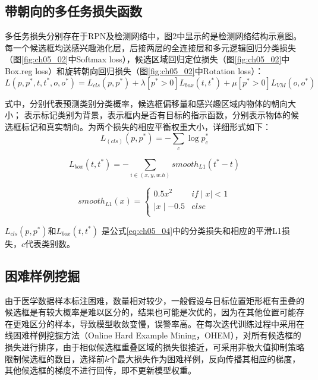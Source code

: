 \subsection{带朝向的多任务损失函数}

多任务损失分别存在于RPN及检测网络中，图2中显示的是检测网络结构示意图。每一个候选框均送感兴趣池化层，后接两层的全连接层和多元逻辑回归分类损失（图\ref{fig:ch05_02}中Softmax loss），候选区域回归定位损失（图\ref{fig:ch05_02}中Box.reg loss）和旋转朝向回归损失（图\ref{fig:ch05_02}中Rotation loss）：
\begin{equation} \label{eq:ch05_10}
      L(p,p^*,t,t^*,o,o^*)=L_{cls}(p,p^*)+\lambda[p^*> 0]L_{box}(t,t^*)+\mu [p^*> 0]L_{VM}(o,o^*)
\end{equation} 

式中，分别代表预测类别分类概率，候选框偏移量和感兴趣区域内物体的朝向大小； 表示标记类别为背景，表示框内是否有目标的指示函数，分别表示物体的候选框标记和真实朝向。为两个损失的相应平衡权重大小，详细形式如下：
\begin{equation} 
\label{eq:ch05_11}
      L_{(cls)}(p,p^*)=-\sum_{c}\log p_{c}^*
\end{equation} 

 \begin{equation} \label{eq:ch05_12}
      L_{box}(t,t^*)=-\sum_{i \in {(x,y,w.h)}}smooth_{L1}(t^*-t)
\end{equation} 

\begin{equation} \label{eq:ch05_13}
smooth_{L1}(x)= \left\{
     \begin{matrix}
0.5x^2 & if \mid x\mid<1 \\
 \mid x\mid-0.5 & else \\
\end{matrix}\right.
\end{equation} 

 $L_{cls}(p,p^*)$和$L_{box}(t,t^*)$ 是公式\ref{eq:ch05_04}中的分类损失和相应的平滑L1损失，$c$代表类别数。
\subsection{困难样例挖掘}

由于医学数据样本标注困难，数量相对较少，一般假设与目标位置矩形框有重叠的候选框是有较大概率是难以区分的，结果也可能是次优的，因为在其他位置可能存在更难区分的样本，导致模型收敛变慢，误警率高。在每次迭代训练过程中采用在线困难样例挖掘方法（Online Hard Example Mining，OHEM）\citep{Shrivastava2016a}，对所有候选框的损失进行排序，由于相似候选框重叠区域的损失很接近，可采用非极大值抑制策略限制候选框的数目，选择前$k$个最大损失作为困难样例，反向传播其相应的梯度，其他候选框的梯度不进行回传，即不更新模型权重。

